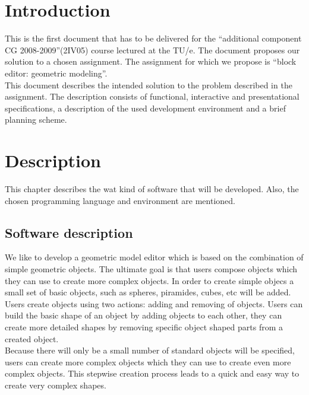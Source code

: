 \documentclass[10pt]{report}
\begin{document}
\newcommand{\doctitle}{Proposal}


\tableofcontents

%
%
\chapter{Introduction}
This is the first document that has to be delivered for the ``additional component CG 2008-2009''(2IV05) course lectured at the TU/e. The document proposes our solution to a chosen assignment. The assignment for which we propose is ``block editor: geometric modeling''.\\

This document describes the intended solution to the problem described in the assignment. The description consists of functional, interactive and presentational specifications, a description of the used development environment and a brief planning scheme.

%
%
\chapter{Description}
This chapter describes the wat kind of software that will be developed. Also, the chosen programming language and environment are mentioned.

\section{Software description}
We like to develop a geometric model editor which is based on the combination of simple geometric objects. The ultimate goal is that users compose objects which they can use to create more complex objects. In order to create simple objecs a small set of basic objects, such as spheres, piramides, cubes, etc will be added.\\

Users create objects using two actions: adding and removing of objects. Users can build the basic shape of an object by adding objects to each other, they can create more detailed shapes by removing specific object shaped parts from a created object.\\

Because there will only be a small number of standard objects will be specified, users can create more complex objects which they can use to create even more complex objects. This stepwise creation process leads to a quick and easy way to create very complex shapes.
\end{document}
